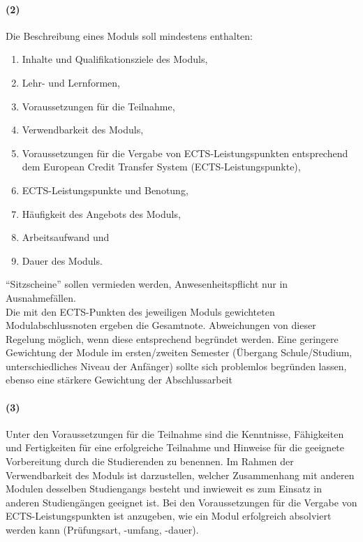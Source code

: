 \documentclass[a4paper]{scrartcl}
\begin{document}
\paragraph{(2)} Die Beschreibung eines Moduls soll mindestens enthalten:
\begin{enumerate}
\item Inhalte und Qualifikationsziele des Moduls,
\item Lehr- und Lernformen,
\item Voraussetzungen für die Teilnahme,
\item Verwendbarkeit des Moduls,
\item Voraussetzungen für die Vergabe von ECTS-Leistungspunkten
entsprechend dem European Credit Transfer System (ECTS-Leistungspunkte),
\item ECTS-Leistungspunkte und Benotung,
\item Häufigkeit des Angebots des Moduls,
\item Arbeitsaufwand und
\item Dauer des Moduls.
\end{enumerate}


\textcolor{Bernd}{\textbf{\cite{PROT: WiSe2015-RL}} \enquote{Sitzscheine} sollen vermieden werden, Anwesenheitspflicht nur in Ausnahmefällen.}\\

\textcolor{Bernd}{\textbf{\cite{RESO: WiSe2008-RL}} Die mit den ECTS-Punkten des jeweiligen Moduls gewichteten Modulabschlussnoten ergeben die Gesamtnote. Abweichungen von dieser Regelung möglich, wenn diese entsprechend begründet werden. Eine geringere Gewichtung der Module im ersten/zweiten Semester (Übergang Schule/Studium, unterschiedliches Niveau der Anfänger) sollte sich problemlos begründen lassen, ebenso eine stärkere Gewichtung der Abschlussarbeit}

\paragraph{(3)} Unter den Voraussetzungen für die Teilnahme sind die Kenntnisse, Fähigkeiten und Fertigkeiten für eine erfolgreiche Teilnahme und Hinweise für die geeignete Vorbereitung durch die Studierenden zu benennen. Im Rahmen der Verwendbarkeit des Moduls ist darzustellen, welcher Zusammenhang mit anderen Modulen desselben Studiengangs besteht und inwieweit es zum Einsatz in anderen Studiengängen geeignet ist. Bei den Voraussetzungen für die Vergabe von ECTS-Leistungspunkten ist anzugeben, wie ein Modul erfolgreich absolviert werden kann (Prüfungsart, -umfang, -dauer).\\
\end{document}

